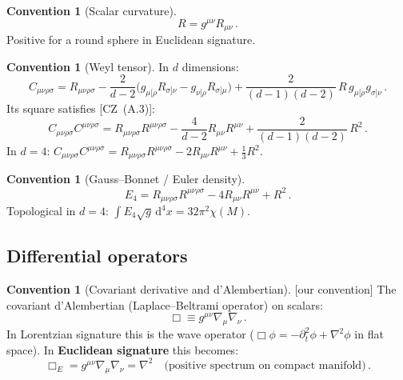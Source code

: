 \documentclass[12pt,a4paper]{article}
\theoremstyle{definition}
\newtheorem{convention}[proposition]{Convention}
\theoremstyle{remark}
\newcommand{\Rsq}{R_{\mu\nu\rho\sigma}R^{\mu\nu\rho\sigma}}
\newcommand{\Ricsq}{R_{\mu\nu}R^{\mu\nu}}
\newcommand{\Weylsq}{C_{\mu\nu\rho\sigma}C^{\mu\nu\rho\sigma}}
\newcommand{\dd}{\mathrm{d}}
\newcommand{\fromlit}[1]{\textcolor{blue!70!black}{\textsf{[#1]}}}
\newcommand{\oursign}{\textcolor{teal!80!black}{\textsf{[our convention]}}}
\begin{document}
\begin{convention}[Scalar curvature]
\begin{equation}
  R = g^{\mu\nu} R_{\mu\nu}\,.
\end{equation}
Positive for a round sphere in Euclidean signature.
\end{convention}

\begin{convention}[Weyl tensor]
In $d$ dimensions:
\begin{equation}
  C_{\mu\nu\rho\sigma}
  = R_{\mu\nu\rho\sigma}
  - \frac{2}{d-2}\bigl(
    g_{\mu[\rho}R_{\sigma]\nu} - g_{\nu[\rho}R_{\sigma]\mu}
  \bigr)
  + \frac{2}{(d-1)(d-2)}\,R\,g_{\mu[\rho}g_{\sigma]\nu}\,.
  \label{eq:weyl}
\end{equation}
Its square satisfies \fromlit{CZ~(A.3)}:
\begin{equation}
  \Weylsq = \Rsq - \frac{4}{d-2}\Ricsq + \frac{2}{(d-1)(d-2)}\,R^2\,.
  \label{eq:weyl-sq}
\end{equation}
In $d=4$: $\Weylsq = \Rsq - 2\Ricsq + \frac{1}{3}R^2$.
\end{convention}

\begin{convention}[Gauss--Bonnet / Euler density]
\begin{equation}
  E_4 = \Rsq - 4\Ricsq + R^2\,.
  \label{eq:euler}
\end{equation}
Topological in $d=4$: $\int E_4\sqrt{g}\,\dd^4x = 32\pi^2\chi(M)$.
\end{convention}


\subsection{Differential operators}

\begin{convention}[Covariant derivative and d'Alembertian]
\oursign\;
The covariant d'Alembertian (Laplace--Beltrami operator) on scalars:
\begin{equation}
  \Box \equiv g^{\mu\nu}\nabla_\mu\nabla_\nu\,.
  \label{eq:box}
\end{equation}
In Lorentzian signature this is the wave operator ($\Box\phi =
-\partial_t^2\phi + \nabla^2\phi$ in flat space).
In \textbf{Euclidean signature} this becomes:
\begin{equation}
  \Box_E = g^{\mu\nu}\nabla_\mu\nabla_\nu = \nabla^2
  \quad\text{(positive spectrum on compact manifold)}\,.
\end{equation}
\end{convention}
\end{document}
